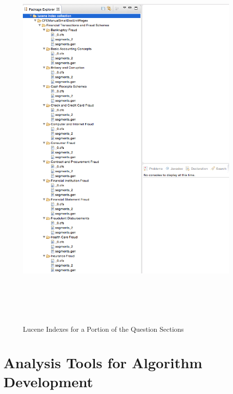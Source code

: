\begin{figure}
\centering
\vspace{1.0in}
\includegraphics[width=125mm, height=200mm]{lucene_indexes.png}
\caption{Lucene Indexes for a Portion of the Question Sections}
\label{fig:lucene_indexes}
\end{figure}



\section{Analysis Tools for Algorithm Development}

